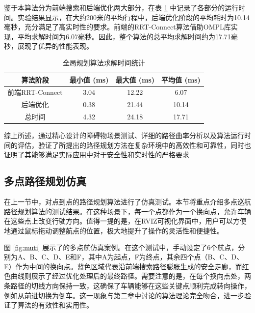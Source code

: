 \documentclass[master,academic]{ysuthesis} %
\begin{document}
		鉴于本算法分为前端搜索和后端优化两大部分，在表 \ref{tab:global_planning_time} 中记录了各部分的运行时间。实验结果显示，在大约200米的平均行程中，后端优化阶段的平均耗时为10.14毫秒，充分满足了高实时性的要求。前端的RRT-Connect算法借助OMPL库实现，平均求解时间为6.07毫秒。因此，整个算法的总平均求解时间约为17.71毫秒，展现了优异的性能表现。
		\begin{table}[!ht]
			\caption{全局规划算法求解时间统计}
			\label{tab:global_planning_time}
			\centering
			\begin{tabular}{cccc}
				\toprule
				算法阶段   & 最小值 (ms) & 最大值 (ms) & 平均值 (ms) \\
				\midrule
				前端RRT-Connect & 3.04    & 12.22   & 6.07       \\
				后端优化       & 0.38    & 21.44    & 10.14      \\
				总时间         & 4.32    & 24.18    & 17.71      \\
				\bottomrule
			\end{tabular}
		\end{table}

		综上所述，通过精心设计的障碍物场景测试、详细的路径曲率分析以及算法运行时间的评估，验证了所提出的路径规划方法在复杂环境中的高效性和可靠性，同时也证明了其能够满足实际应用中对于安全性和实时性的严格要求

		\subsection{多点路径规划仿真}
		在上一节中，对点到点的路径规划算法进行了仿真测试。本节将重点介绍多点巡航路径规划算法的测试结果。在这种场景下，每一个点都作为一个换向点，允许车辆在这些点上改变行驶方向。值得一提的是，在RVIZ可视化界面中，用户可以方便地通过鼠标拖动调整航点的位置，极大地提升了操作的灵活性和便捷性。

		图 \ref{fig:muti} 展示了的多点航仿真案例。在这个测试中，手动设定了6个航点，分别为A、B、C、D、E和F，其中A为起点，F为终点，其余四个点（B、C、D、E）作为中间的换向点。蓝色区域代表沿前端搜索路径膨胀生成的安全走廊，而红色曲线则展示了经过优化处理后的最终路径。需要注意的是，在每个换向点处，两条路径的切线方向保持一致，这确保了车辆能够在这些关键点顺利完成转向操作，例如从前进切换为倒车。这一现象与第二章中讨论的算法理论完全吻合，进一步验证了算法的有效性和实用性。
		
\end{document}
